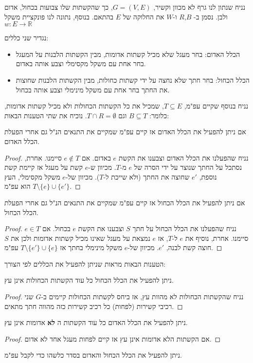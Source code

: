 נניח שנתון לנו גרף לא מכוון וקשיר,
$G = (V, E)$,
כך שהקשתות שלו צבועות בכחול, אדום ולבן.
נסמן ב-%
$B$,$R$
ו-$W$ את החלוקה של $E$ בהתאם.
בנוסף, נתונה לנו פונקציית משקל
$w:E \to \mathbb{R}$

נגדיר שני כללים:

\begin{itemize}
\item 
הכלל האדום: בחר מעגל שלא מכיל קשתות אדומות, 
מבין הקשתות הלבנות על המעגל בחר אחת עם משקל מקסימלי וצבע אותה באדום.
\item
הכלל הכחול: בחר חתך שלא נחצה על ידי קשתות כחולות, 
מבין הקשתות הלבנות שחוצות את החתך בחר אחת עם משקל מינימלי וצבע אותה בכחול.
\end{itemize}

נניח בנוסף שקיים עפ"מ, 
$T \subseteq E$, 
שמכיל את כל הקשתות הכחולות ולא מכיל קשתות אדומות, כלומר:
$B \subseteq T$
וגם
$T \cap R = \emptyset$.
נוכיח את שתי הטענות הבאות:
\begin{claim}
אם ניתן להפעיל את הכלל האדום אז קיים עפ"מ שמקיים את התנאים הנ"ל גם אחרי הפעלת הכלל האדום.
\end{claim}

\begin{proof}
נניח שהפעלנו את הכלל האדום וצבענו את הקשת $e$ באדום.
אם 
$e \notin T$
סיימנו.
אחרת, נסתכל על החתך שנוצר על ידי הסרה של $e$ מ-$T$.
מכיוון ש-$e$ קשת על מעגל אז קיימת קשת נוספת, $e'$ שחוצה את החתך (ולא שייכת ל-$T$).
מכיוון של-$e$ משקל מקסימלי, העץ 
$T \setminus \{e\} \cup \{e'\}$
הוא עפ"מ.
\end{proof}

\begin{claim}
אם ניתן להפעיל את הכלל הכחול אז קיים עפ"מ שמקיים את התנאים הנ"ל גם אחרי הפעלת הכלל הכחול.
\end{claim}

\begin{proof}
נניח שהפעלנו את הכלל הכחול על חתך $S$ וצבענו את הקשת $e$ בכחול.
אם 
$e \in T$
סיימנו.
אחרת, נוסיף את $e$ ל-$T$, אז $e$ נמצאת על מעגל שאינו מכיל קשתות אדומות ולכן את $S$
חוצה קשת לבנה, $e'$.
מכיוון של-$e$ משקל מינימלי בחתך אז
$T \setminus \{e'\} \cup \{e\}$
עפ"מ.
\end{proof}

הטענות הבאות מראות שניתן להפעיל את הכללים לפי הצורך:

\begin{claim}
ניתן להפעיל את הכלל הכחול כל עוד הקשתות הכחולות אינן עץ.
\end{claim}

\begin{proof}
נניח שהקשתות הכחולות לא מהוות עץ, אז ביחס לקשתות הכחולות קיימים ב-$G$ שני רכיבי קשירות (לפחות)
כל רכיב קשירות כזה מהווה חתך מתאים.
\end{proof}

\begin{claim}
ניתן להפעיל את הכלל האדום כל עוד הקשתות ה%
\textbf{לא}
אדומות אינן עץ.
\end{claim}

\begin{proof}
אם הקשתות הלא אדומות אינן עץ אז קיים לפחות מעגל אחד לא אדום.
\end{proof}

\begin{corollary}
ניתן להפעיל את הכלל הכחול והאדום בסדר כלשהו כדי לקבל עפ"מ.
\end{corollary}
